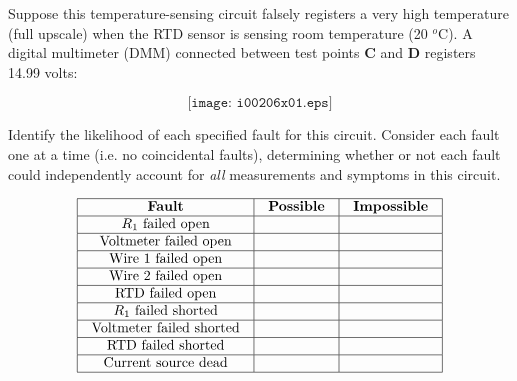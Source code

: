 

Suppose this temperature-sensing circuit falsely registers a very high temperature (full upscale) when the RTD sensor is sensing room temperature (20 $^{o}$C).  A digital multimeter (DMM) connected between test points {\bf C} and {\bf D} registers 14.99 volts:

$$\texttt{[image: i00206x01.eps]}$$

Identify the likelihood of each specified fault for this circuit.  Consider each fault one at a time (i.e. no coincidental faults), determining whether or not each fault could independently account for {\it all} measurements and symptoms in this circuit.


$$\vbox{\offinterlineskip
\halign{\strut
\vrule \quad\hfil # \ \hfil & 
\vrule \quad\hfil # \ \hfil & 
\vrule \quad\hfil # \ \hfil \vrule \cr
\noalign{\hrule}
%
{\bf Fault} & {\bf Possible} & {\bf Impossible} \cr
%
\noalign{\hrule}
%
$R_1$ failed open &  &  \cr
%
\noalign{\hrule}
%
Voltmeter failed open &  &  \cr
%
\noalign{\hrule}
%
Wire 1 failed open &  &  \cr
%
\noalign{\hrule}
%
Wire 2 failed open &  &  \cr
%
\noalign{\hrule}
%
RTD failed open &  &  \cr
%
\noalign{\hrule}
%
$R_1$ failed shorted &  &  \cr
%
\noalign{\hrule}
%
Voltmeter failed shorted &  &  \cr
%
\noalign{\hrule}
%
RTD failed shorted &  &  \cr
%
\noalign{\hrule}
%
Current source dead &  &  \cr
%
\noalign{\hrule}
} %
}$$ %

\vfil 

\eject







